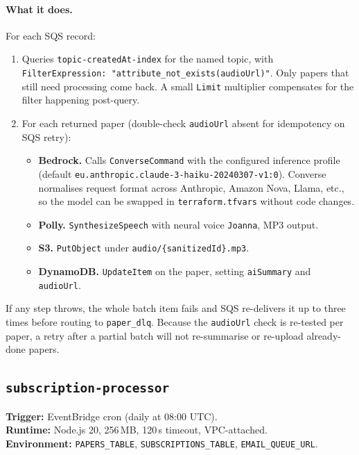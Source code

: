 \documentclass[11pt,a4paper]{article}
\begin{document}
\paragraph{What it does.} For each SQS record:
\begin{enumerate}[leftmargin=*]
  \item Queries \texttt{topic-createdAt-index} for the named topic, with \texttt{FilterExpression: "attribute\_not\_exists(audioUrl)"}. Only papers that still need processing come back. A small \texttt{Limit} multiplier compensates for the filter happening post-query.
  \item For each returned paper (double-check \texttt{audioUrl} absent for idempotency on SQS retry):
    \begin{itemize}[leftmargin=*]
      \item \textbf{Bedrock.} Calls \texttt{ConverseCommand} with the configured inference profile (default \texttt{eu.anthropic.claude-3-haiku-20240307-v1:0}). Converse normalises request format across Anthropic, Amazon Nova, Llama, etc., so the model can be swapped in \texttt{terraform.tfvars} without code changes.
      \item \textbf{Polly.} \texttt{SynthesizeSpeech} with neural voice \texttt{Joanna}, MP3 output.
      \item \textbf{S3.} \texttt{PutObject} under \texttt{audio/\{sanitizedId\}.mp3}.
      \item \textbf{DynamoDB.} \texttt{UpdateItem} on the paper, setting \texttt{aiSummary} and \texttt{audioUrl}.
    \end{itemize}
\end{enumerate}

If any step throws, the whole batch item fails and SQS re-delivers it up to three times before routing to \texttt{paper\_dlq}. Because the \texttt{audioUrl} check is re-tested per paper, a retry after a partial batch will not re-summarise or re-upload already-done papers.

\subsection{\texttt{subscription-processor}}

\textbf{Trigger:} EventBridge cron (daily at 08:00 UTC). \\
\textbf{Runtime:} Node.js 20, 256\,MB, 120\,s timeout, VPC-attached. \\
\textbf{Environment:} \texttt{PAPERS\_TABLE}, \texttt{SUBSCRIPTIONS\_TABLE}, \texttt{EMAIL\_QUEUE\_URL}.
\end{document}
